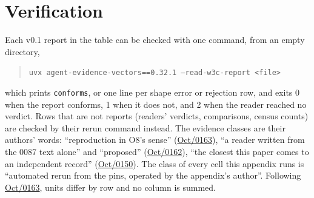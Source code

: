 \providecommand{\aevmsg}[2]{\href{https://lists.w3.org/Archives/Public/public-agent-conformance/2026#1/#2.html}{#1/#2}}
\providecommand{\aevreadrelease}{0.32.1}

\section{Verification}
\label{sec:w3c-verification}

Each v0.1 report in the table can be checked with one command, from an empty directory,
\begin{quote}
\texttt{uvx agent-evidence-vectors==\aevreadrelease{} --read-w3c-report <file>}
\end{quote}
\noindent which prints \texttt{conforms}, or one line per shape error or rejection row, and exits 0 when the report conforms, 1 when it does not, and 2 when the reader reached no verdict. Rows that are not reports (readers' verdicts, comparisons, census counts) are checked by their rerun command instead. The evidence classes are their authors' words: ``reproduction in O8's sense'' (\aevmsg{Oct}{0163}), ``a reader written from the 0087 text alone'' and ``proposed'' (\aevmsg{Oct}{0162}), ``the closest this paper comes to an independent record'' (\aevmsg{Oct}{0150}). The class of every cell this appendix runs is ``automated rerun from the pins, operated by the appendix's author''. Following \aevmsg{Oct}{0163}, units differ by row and no column is summed.

